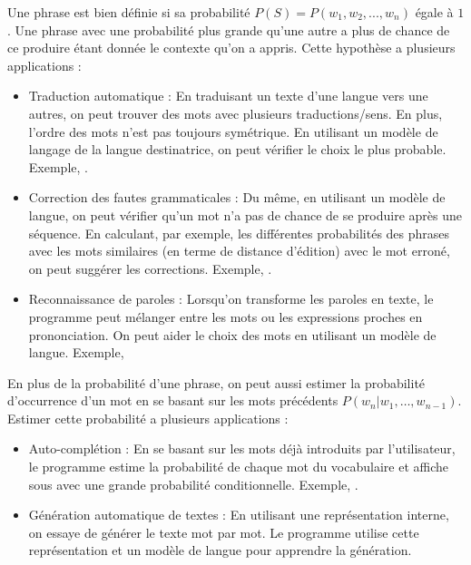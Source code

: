 \documentclass{KodeBook}
\begin{document}
Une phrase est bien définie si sa probabilité $P(S) = P(w_1, w_2, ..., w_n) $ égale à $1$. 
Une phrase avec une probabilité plus grande qu'une autre a plus de chance de ce produire étant donnée le contexte qu'on a appris. 
Cette hypothèse a plusieurs applications : 
\begin{itemize}
	\item Traduction automatique : En traduisant un texte d'une langue vers une autres, on peut trouver des mots avec plusieurs traductions/sens. 
	En plus, l'ordre des mots n'est pas toujours symétrique. 
	En utilisant un modèle de langage de la langue destinatrice, on peut vérifier le choix le plus probable. 
	Exemple, 
	.
	
	\item Correction des fautes grammaticales : Du même, en utilisant un modèle de langue, on peut vérifier qu'un mot n'a pas de chance de se produire après une séquence. 
	En calculant, par exemple, les différentes probabilités des phrases avec les mots similaires (en terme de distance d'édition) avec le mot erroné, on peut suggérer les corrections.
	Exemple, .
	
	\item Reconnaissance de paroles : Lorsqu'on transforme les paroles en texte, le programme peut mélanger entre les mots ou les expressions proches en prononciation. 
	On peut aider le choix des mots en utilisant un modèle de langue.
	Exemple, 
\end{itemize}
%
En plus de la probabilité d'une phrase, on peut aussi estimer la probabilité d'occurrence d'un mot en se basant sur les mots précédents $P(w_n | w_1, \ldots, w_{n-1}) $. 
Estimer cette probabilité a plusieurs applications :
\begin{itemize}
	\item Auto-complétion : En se basant sur les mots déjà introduits par l'utilisateur, le programme estime la probabilité de chaque mot du vocabulaire et affiche sous avec une grande probabilité conditionnelle.
	Exemple, .
	
	\item Génération automatique de textes : En utilisant une représentation interne, on essaye de générer le texte mot par mot. 
	Le programme utilise cette représentation et un modèle de langue pour apprendre la génération.
\end{itemize}
\end{document}
